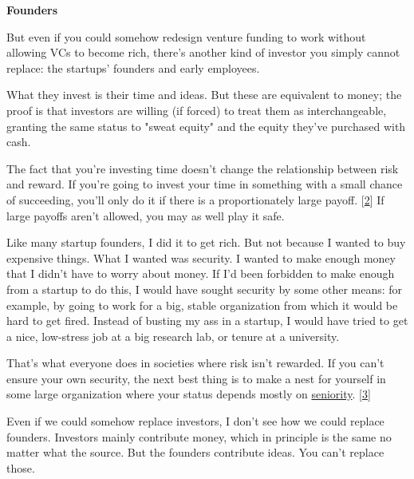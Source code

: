 \textbf{Founders}

But even if you could somehow redesign venture
                  funding to work without allowing VCs to become rich, there's
                  another kind of investor you simply cannot replace: the
                  startups' founders and early employees.

What they
                  invest is their time and ideas. But these are equivalent to
                  money; the proof is that investors are willing (if forced) to
                  treat them as interchangeable, granting the same status to
                  "sweat equity" and the equity they've purchased with cash.

The
                  fact that you're investing time doesn't change the
                  relationship between risk and reward. If you're going to
                  invest your time in something with a small chance of
                  succeeding, you'll only do it if there is a proportionately
                  large payoff.
                  [\href{\#f2n}{2}]
                  If large payoffs aren't allowed, you may as well play it
                  safe.

Like many startup founders, I did it to get
                  rich. But not because I wanted to buy expensive things. What I
                  wanted was security. I wanted to make enough money that I
                  didn't have to worry about money. If I'd been forbidden to
                  make enough from a startup to do this, I would have sought
                  security by some other means: for example, by going to work
                  for a big, stable organization from which it would be hard to
                  get fired. Instead of busting my ass in a startup, I would
                  have tried to get a nice, low-stress job at a big research
                  lab, or tenure at a university.

That's what
                  everyone does in societies where risk isn't rewarded. If you
                  can't ensure your own security, the next best thing is to make
                  a nest for yourself in some large organization where your
                  status depends mostly on \href{http://www.paulgraham.com/ladder.html}{seniority}.
                  [\href{\#f3n}{3}]

Even if we could somehow replace investors, I
                  don't see how we could replace founders. Investors mainly
                  contribute money, which in principle is the same no matter
                  what the source. But the founders contribute ideas. You can't
                  replace those.

